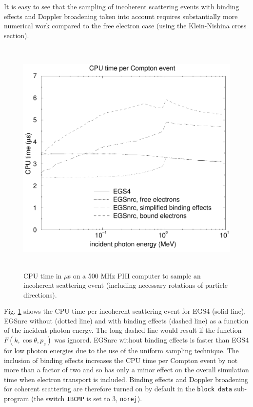 It is easy to see that the sampling of incoherent scattering events
with binding effects and Doppler broadening taken into account
requires substantially more numerical work compared to
the free electron case (using the Klein-Nishina cross section).
\begin{figure}[h]
\includegraphics[height=12cm,width=12cm]{figures/comp_times}
\caption[CPU times for Compton sampling]{\label{comp_times}
CPU time in $\mu$s on a 500 MHz PIII computer to sample an incoherent
scattering event (including necessary rotations of particle directions).}
\end{figure}
Fig. \ref{comp_times} shows the CPU time per incoherent scattering event
for EGS4 (solid line), EGSnrc without (dotted line)
and with binding effects (dashed line) as a function of the incident
photon energy. The long dashed line would result if the function
$F(k,\cos \theta,p_z)$ was ignored. EGSnrc without binding effects is
faster than EGS4 for low photon energies due to the use of
the uniform sampling technique. The inclusion of binding effects
increases the CPU time per Compton event by not more than a
factor of two and so has only a minor effect on the overall simulation
time when electron transport is included. Binding effects and
Doppler broadening for coherent scattering are therefore turned
on by default in the {\tt block data} sub-program (the switch
{\tt IBCMP} is set to 3, {\tt norej}).

